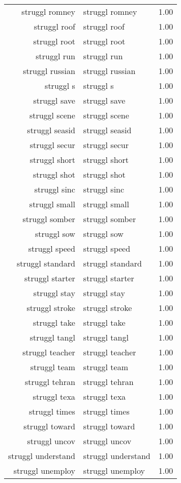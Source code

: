 \begin{table}[ht]
\begin{tabular}{rlr}
  struggl romney & struggl romney & 1.00 \\ 
  struggl roof & struggl roof & 1.00 \\ 
  struggl root & struggl root & 1.00 \\ 
  struggl run & struggl run & 1.00 \\ 
  struggl russian & struggl russian & 1.00 \\ 
  struggl s & struggl s & 1.00 \\ 
  struggl save & struggl save & 1.00 \\ 
  struggl scene & struggl scene & 1.00 \\ 
  struggl seasid & struggl seasid & 1.00 \\ 
  struggl secur & struggl secur & 1.00 \\ 
  struggl short & struggl short & 1.00 \\ 
  struggl shot & struggl shot & 1.00 \\ 
  struggl sinc & struggl sinc & 1.00 \\ 
  struggl small & struggl small & 1.00 \\ 
  struggl somber & struggl somber & 1.00 \\ 
  struggl sow & struggl sow & 1.00 \\ 
  struggl speed & struggl speed & 1.00 \\ 
  struggl standard & struggl standard & 1.00 \\ 
  struggl starter & struggl starter & 1.00 \\ 
  struggl stay & struggl stay & 1.00 \\ 
  struggl stroke & struggl stroke & 1.00 \\ 
  struggl take & struggl take & 1.00 \\ 
  struggl tangl & struggl tangl & 1.00 \\ 
  struggl teacher & struggl teacher & 1.00 \\ 
  struggl team & struggl team & 1.00 \\ 
  struggl tehran & struggl tehran & 1.00 \\ 
  struggl texa & struggl texa & 1.00 \\ 
  struggl times & struggl times & 1.00 \\ 
  struggl toward & struggl toward & 1.00 \\ 
  struggl uncov & struggl uncov & 1.00 \\ 
  struggl understand & struggl understand & 1.00 \\ 
  struggl unemploy & struggl unemploy & 1.00 \\ 

\end{tabular}
\end{table}
